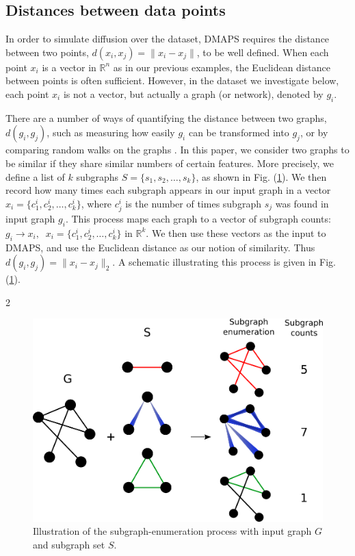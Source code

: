 \documentclass[11pt]{article}
\begin{document}
\clearpage

\begin{multicols}{2}

\section{Distances between data points}
In order to simulate diffusion over the dataset, DMAPS requires the distance between two points, $d(x_i, x_j) = \| x_i - x_j \|$, to be well defined. When each point $x_i$ is a vector in $\mathbb{R}^n$ as in our previous examples, the Euclidean distance between points is often sufficient. However, in the dataset we investigate below, each point $x_i$ is not a vector, but actually a graph (or network), denoted by $g_i$.

There are a number of ways of quantifying the distance between two graphs, $d(g_i, g_j)$, such as measuring how easily $g_i$ can be transformed into $g_j$, or by comparing random walks on the graphs \cite{edit_dist} \cite{graph_kernels}. In this paper, we consider two graphs to be similar if they share similar numbers of certain features. More precisely, we define a list of $k$ subgraphs $S=\{s_1, s_2, \ldots, s_k\}$, as shown in Fig. (\ref{fig:subgraph_counting}). We then record how many times each subgraph appears in our input graph in a vector $x_i = \{c_1^i, c_2^i, \ldots, c_k^i\}$, where $c_j^i$ is the number of times subgraph $s_j$ was found in input graph $g_i$. This process maps each graph to a vector of subgraph counts: $g_i \rightarrow x_i, \; \; x_i = \{c_1^i, c_2^i, \ldots, c_k^i\}$ in $\mathbb{R}^k$. We then use these vectors as the input to DMAPS, and use the Euclidean distance as our notion of similarity. Thus $d(g_i, g_j) = \| x_i - x_j \|_2$. A schematic illustrating this process is given in Fig. (\ref{fig:subgraph_counting}).

\end{multicols}{2}

\begin{figure}[!h]
  \begin{center}
    \includegraphics[height=0.45\textheight]{subgraph_counting}
    \caption{Illustration of the subgraph-enumeration process with input graph $G$ and subgraph set $S$.}
    \label{fig:subgraph_counting}
  \end{center}
\end{figure}
\end{document}
